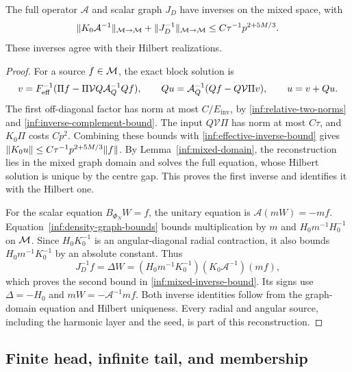 \begin{proposition}\label{inf:mixed-inverse}
The full operator $\mathcal A$ and scalar graph $J_D$ have
inverses on the mixed space, with
\begin{equation}\label{inf:mixed-inverse-bound}
 \lVert K_0\mathcal A^{-1}\rVert_{\mathcal M\to\mathcal M}
       +\lVert J_D^{-1}\rVert_{\mathcal M\to\mathcal M}
 \le C\tau^{-1}p^{2+5M/3}.
\end{equation}
These inverses agree with their Hilbert realizations.
\end{proposition}
\begin{proof}
For a source $f\in\mathcal M$, the exact block solution is
\[
 v=F_{\mathrm{eff}}^{-1}(\Pi f-\Pi\mathcal VQ\mathcal A_Q^{-1}Qf),\qquad
 Qu=\mathcal A_Q^{-1}(Qf-Q\mathcal V\Pi v),\qquad u=v+Qu.
\]
The first off-diagonal factor has norm at most $C/E_{\mathrm{inv}}$,
by \eqref{inf:relative-two-norms} and
\eqref{inf:inverse-complement-bound}. The input $Q\mathcal V\Pi$
has norm at most $C\tau$, and $K_0\Pi$ costs $Cp^2$.
Combining these bounds with \eqref{inf:effective-inverse-bound}
gives $\lVert K_0u\rVert\le C\tau^{-1}p^{2+5M/3}\lVert f\rVert$.
By Lemma~\ref{inf:mixed-domain}, the reconstruction lies in the
mixed graph domain and solves the
full equation, whose Hilbert solution is unique by the centre gap.
This proves the first inverse and identifies it with the Hilbert one.

For the scalar equation $B_{\Phi_N}W=f$, the unitary equation is
$\mathcal A(mW)=-mf$. Equation~\eqref{inf:density-graph-bounds}
bounds multiplication by $m$ and $H_0m^{-1}H_0^{-1}$ on $\mathcal M$.
Since $H_0K_0^{-1}$ is an angular-diagonal radial contraction,
it also bounds $H_0m^{-1}K_0^{-1}$ by an absolute constant.
Thus
\[
 J_D^{-1}f=\Delta W
 =(H_0m^{-1}K_0^{-1})(K_0\mathcal A^{-1})(mf),
\]
which proves the second bound in \eqref{inf:mixed-inverse-bound}.
Its signs use $\Delta=-H_0$ and $mW=-\mathcal A^{-1}mf$.
Both inverse identities follow from the graph-domain equation and
Hilbert uniqueness. Every radial and angular source, including the
harmonic layer and the seed, is part of this reconstruction.
\end{proof}

\subsection{Finite head, infinite tail, and membership}

